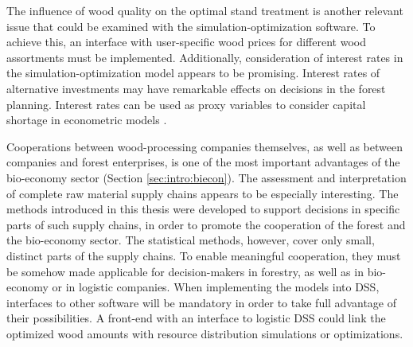 The influence of wood quality on the optimal stand treatment is another relevant issue that could be examined with the si\-mu\-la\-tion-op\-ti\-mi\-za\-tion software. To achieve this, an interface with user-specific wood prices for different wood assortments must be implemented. Additionally, consideration of interest rates in the simulation-optimization model appears to be promising. Interest rates of alternative investments may have remarkable effects on decisions in the forest planning. Interest rates can be used as proxy variables to consider capital shortage in econometric models \citep[p. 349-351]{mohring_2010}.

Cooperations between wood-processing companies themselves, as well as between companies and forest enterprises, is one of the most important advantages of the bio-economy sector (Section \ref{sec:intro:biecon}). The assessment and interpretation of complete raw material supply chains appears to be especially interesting. The methods introduced in this thesis were developed to support decisions in specific parts of such supply chains, in order to promote the cooperation of the forest and the bio-economy sector. The statistical methods, however, cover only small, distinct parts of the supply chains. To enable meaningful cooperation, they must be somehow made applicable for decision-makers in forestry, as well as in bio-economy or in logistic companies. When implementing the models into DSS, interfaces to other software will be mandatory in order to take full advantage of their possibilities. A front-end with an interface to logistic DSS could link the optimized wood amounts with resource distribution simulations or optimizations.